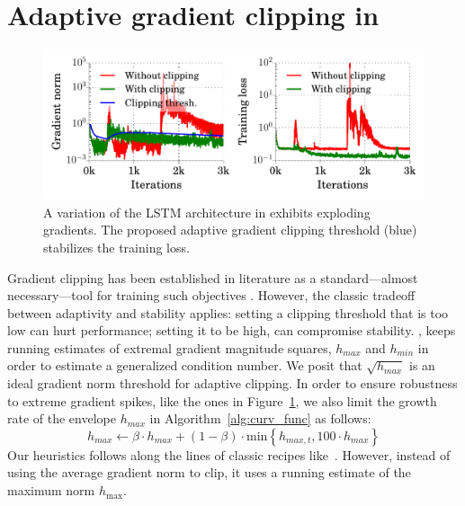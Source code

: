 \section{Adaptive gradient clipping in \tuner}
\label{sec:adapt_clip}
\begin{figure}
\centering
  \includegraphics[width=0.7\linewidth]{experiment_results/clipping_example.pdf} 
\caption{A variation of the LSTM architecture in \citep{zhu2016trained} exhibits exploding gradients.
The proposed adaptive gradient clipping threshold (blue) stabilizes the training loss.}
\label{fig:stability}
\end{figure}

Gradient clipping has been established in literature as a standard---almost necessary---tool for training such objectives \citep{pascanu2013difficulty,Goodfellow-et-al-2016,gehring2017convolutional}. 
However, the classic tradeoff between adaptivity and stability applies: 
setting a clipping threshold that is too low can hurt performance;
setting it to be high, can compromise stability.
\tuner, keeps running estimates of extremal gradient magnitude squares, $h_{max}$ and $h_{min}$ in order to estimate a generalized condition number.
We posit that $\sqrt{h_{max}}$ is an ideal gradient norm threshold for adaptive clipping.
In order to ensure robustness to extreme gradient spikes, like the ones in Figure~\ref{fig:stability}, we also limit the growth rate of the envelope $h_{max}$ in Algorithm~\ref{alg:curv_func} as follows:
\begin{equation}
 h_{max} 
 \leftarrow
 \beta \cdot h_{max}
 	+ (1-\beta) \cdot \textrm{min}\left\{
 		h_{max,t}, 100 \cdot h_{max}
 	\right\}
\end{equation}
Our heuristics follows along the lines of classic recipes like~\cite{pascanu2013difficulty}. However, instead of using the average gradient norm to clip, it uses a running estimate of the maximum norm $h_{\max}$.


